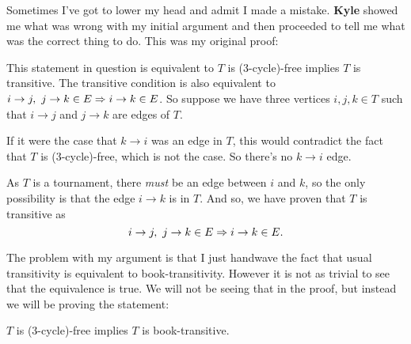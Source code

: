 \documentclass[12pt]{memoir}
\begin{document}
Sometimes I've got to lower my head and admit I made a mistake. \textbf{Kyle} showed me what was wrong with my initial argument and then proceeded to tell me what was the correct thing to do. This was my original proof:
\iffalse
Triangle-free graphs are so \emph{fun}, the first result I saw in graph theory was Mantel's theorem. I still remember that class very vividly, my professor asked us for examples of $K_3$-free graphs and the best I could come up with was a path graph. Eventually other people came up with bipartite graphs and then he stated, ``\emph{The most edges that a $K_3$-graph can have is $n^2/4$ and the extremal graph is $K_{n/2,n/2}$.}''\par 
It is not the same case for directed graphs but still, this problem is related to triangle-free graphs. 
\fi
\begin{ptcb}
    This statement in question is equivalent to $T$ is (3-cycle)-free implies $T$ is transitive. The transitive condition is also equivalent to $i\to j,\ j\to k\in E\Rightarrow i\to k\in E$. So suppose we have three vertices $i,j,k\in T$ such that $i\to j$ and $j\to k$ are edges of $T$.\par 
    If it were the case that $k\to i$ was an edge in $T$, this would contradict the fact that $T$ is (3-cycle)-free, which is not the case. So there's no $k\to i$ edge.\par 
    As $T$ is a tournament, there \emph{must} be an edge between $i$ and $k$, so the only possibility is that the edge $i\to k$ is in $T$. And so, we have proven that $T$ is transitive as 
    $$i\to j,\ j\to k\in E\Rightarrow i\to k\in E.$$
\end{ptcb}

The problem with my argument is that I just handwave the fact that usual transitivity is equivalent to book-transitivity. However it is not as trivial to see that the equivalence is true. We will not be seeing that in the proof, but instead we will be proving the statement:
\vspace*{-2em} 
\begin{significant}
$T$ is (3-cycle)-free implies $T$ is book-transitive.
\end{significant}
\end{document}
